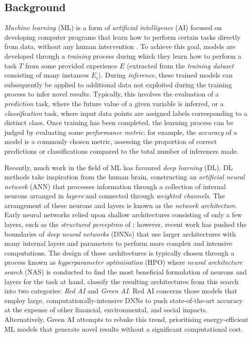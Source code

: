 \documentclass[a4paper, 12pt]{article}
\begin{document}
    \subsection{Background}

    \emph{Machine learning} (ML) is a form of \emph{artificial intelligence} (AI) focused on developing computer programs that learn how to perform certain tasks directly from data, without any human intervention \cite{samuel-1959}. To achieve this goal, models are developed through a \emph{training} process during which they learn how to perform a task $T$ from some provided experience $E$ (extracted from the \emph{training dataset} consisting of many instances $E_i$). During \emph{inference}, these trained models can subsequently be applied to additional data not exploited during the training process to infer novel results. Typically, this involves the evaluation of a \emph{prediction} task, where the future value of a given variable is inferred, or a \emph{classification} task, where input data points are assigned labels corresponding to a distinct class. Once training has been completed, the learning process can be judged by evaluating some \emph{performance metric}: for example, the \emph{accuracy} of a model is a commonly chosen metric, assessing the proportion of correct predictions or classifications compared to the total number of inferences made. 

    Recently, much work in the field of ML has favoured \emph{deep learning} (DL). DL methods take inspiration from the human brain, constructing an \emph{artificial neural network} (ANN) that processes information through a collection of internal neurons arranged in \emph{layers} and connected through \emph{weighted channels}. The arrangement of these neurons and layers is known as the \emph{network architecture}. Early neural networks relied upon shallow architectures consisting of only a few layers, such as the \emph{structured perceptron} of ; however, recent work has pushed the boundaries of \emph{deep neural networks} (DNNs) that use larger architectures with many internal layers and parameters to perform more complex and intensive computations. The design of these architectures is typically chosen through a process known as \emph{hyperparameter optimisation} (HPO) where \emph{neural architecture search} (NAS) is conducted to find the most beneficial formulation of neurons and layers for the task at hand.  classify the resulting architectures from this search into two categories: \emph{Red AI} and \emph{Green AI}. Red AI concerns those models that employ large, computationally-intensive DNNs to push state-of-the-art accuracy at the expense of other financial, environmental, and social impacts. Alternatively, Green AI attempts to rebuke this trend, prioritising energy-efficient ML models that generate novel results without a significant computational cost. 
\end{document}
